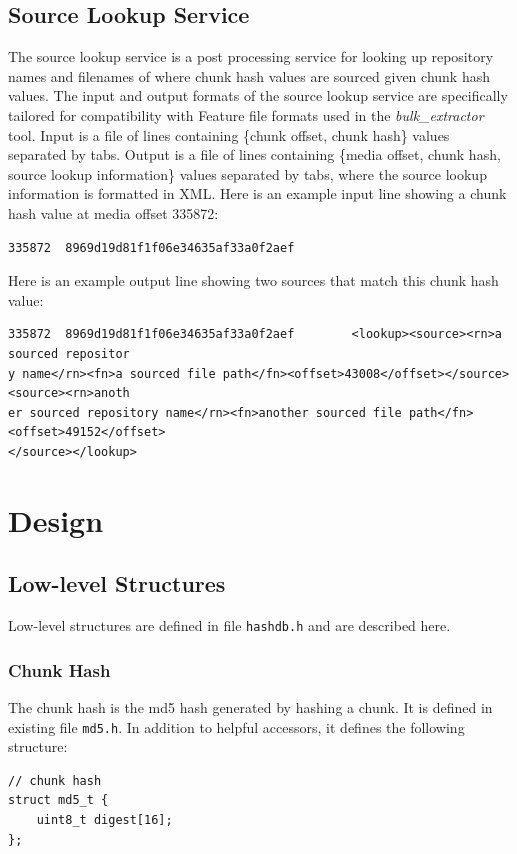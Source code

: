 \documentclass[10pt,twoside]{article}
\newcommand{\bulk}{\emph{bulk\_extractor}\xspace}
\begin{document}
\subsection{Source Lookup Service}
The source lookup service is a post processing service
for looking up repository names and filenames of where chunk hash values are sourced
given chunk hash values.
The input and output formats of the source lookup service are specifically tailored
for compatibility with Feature file formats used in the \bulk tool.
Input is a file of lines containing \{chunk offset, chunk hash\} values separated by tabs.
Output is a file of lines containing \{media offset, chunk hash,
source lookup information\} values
separated by tabs, where the source lookup information is formatted in XML.
Here is an example input line showing a chunk hash value at media offset 335872:
\begin{small}
\begin{verbatim}
335872  8969d19d81f1f06e34635af33a0f2aef
\end{verbatim}
\end{small}
Here is an example output line showing two sources that match this chunk hash value:
\begin{small}
\begin{verbatim}
335872  8969d19d81f1f06e34635af33a0f2aef        <lookup><source><rn>a sourced repositor
y name</rn><fn>a sourced file path</fn><offset>43008</offset></source><source><rn>anoth
er sourced repository name</rn><fn>another sourced file path</fn><offset>49152</offset>
</source></lookup>
\end{verbatim}
\end{small}

\section{Design}
\subsection{Low-level Structures}
Low-level structures are defined in file \texttt{hashdb.h}
and are described here.
\subsubsection{Chunk Hash}
The chunk hash is the md5 hash generated by hashing a chunk.
It is defined in existing file \texttt{md5.h}.
In addition to helpful accessors, it defines the following structure:
\begin{small}
\begin{verbatim}
// chunk hash
struct md5_t {
    uint8_t digest[16];
};
\end{verbatim}
\end{small}
\end{document}
